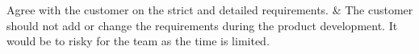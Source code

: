 
\nextItem Agree with the customer on the strict and detailed requirements. & The customer should not add or change the requirements during the product development. It would be to risky for the team as the time is limited.
